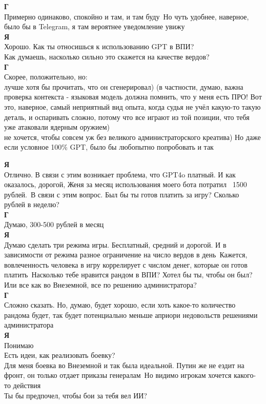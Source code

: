 \textbf{Г}\\
Примерно одинаково, спокойно и там, и там буду\
Но чуть удобнее, наверное, было бы в Telegram, я там вероятнее уведомление увижу\\

\textbf{Я}\\
Хорошо. Как ты относишься к использованию GPT в ВПИ?\\
Как думаешь, насколько сильно это скажется на качестве вердов?\\

\textbf{Г}\\
Скорее, положительно, но:\\
лучше хотя бы прочитать, что он сгенерировал) (в частности, думаю, важна проверка контекста - языковая модель должна помнить, что у меня есть ПРО! Вот это, наверное, самый неприятный вид опыта, когда судья не учёл какую-то такую деталь, и оспаривать сложно, потому что все играют из той позиции, что тебя уже атаковали ядерным оружием)\\
не хочется, чтобы совсем уж без великого администраторского креатива) Но даже если условное 100\% GPT, было бы любопытно попробовать и так

\textbf{Я}\\
Отлично. В связи с этим возникает проблема, что GPT4o платный. И как оказалось, дорогой, Женя за месяц использования моего бота потратил ~1500 рублей.\
В связи с этим вопрос. Был бы ты готов платить за игру? Сколько рублей в неделю?\\

\textbf{Г}\\
Думаю, 300-500 рублей в месяц\\

\textbf{Я}\\
Думаю сделать три режима игры. Бесплатный, средний и дорогой. И в зависимости от режима разное ограничение на число вердов в день\
Кажется, вовлеченность человека в игру коррелирует с числом денег, которые он готов платить\
Насколько тебе нравится рандом в ВПИ? Хотел бы ты, чтобы он был? Или все как во Внеземной, все по решению администратора?\\

\textbf{Г}\\
Сложно сказать. Но, думаю, будет хорошо, если хоть какое-то количество рандома будет, так будет потенциально меньше априори недовольств решениями администратора\\

\textbf{Я}\\
Понимаю\\
Есть идеи, как реализовать боевку?\\
Для меня боевка во Внеземной и так была идеальной. Путин же не ездит на фронт, он только отдает приказы генералам\
Но видимо игрокам хочется какого-то действия\\
Ты бы предпочел, чтобы бои за тебя вел ИИ?\\

